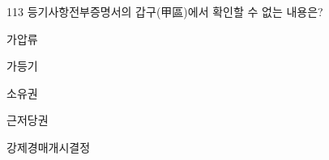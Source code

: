 \begin{question}{113}
등기사항전부증명서의 갑구(甲區)에서 확인할 수 없는 내용은?
\begin{choices}
  \item 가압류
  \item 가등기
  \item 소유권
  \item 근저당권
  \item 강제경매개시결정
\end{choices}
\end{question}
